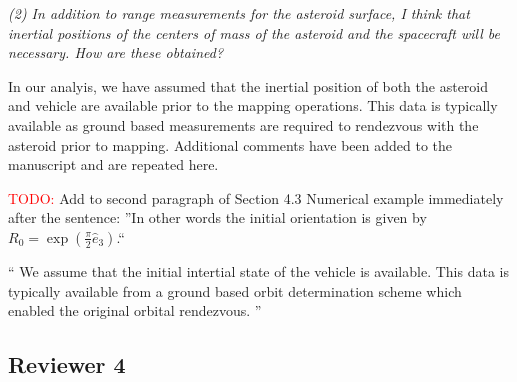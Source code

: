 \documentclass[11pt]{article}
\newcommand{\todo}{{\large \textcolor{red}{TODO: }}}
\newenvironment{correction}{\begin{list}{}{\setlength{\leftmargin}{1cm}\setlength{\rightmargin}{1cm}}\vspace{\parsep}\item[]``}{''\end{list}}
\newcommand{\comment}[1]{\item \itshape #1 \normalfont}
\begin{document}
\begin{itemize}
\comment{(2) In addition to range measurements for the asteroid surface, I think that inertial positions of the centers of mass of the asteroid and the spacecraft will be necessary.
How are these obtained?}

In our analyis, we have assumed that the inertial position of both the asteroid and vehicle are available prior to the mapping operations.
This data is typically available as ground based measurements are required to rendezvous with the asteroid prior to mapping.
Additional comments have been added to the manuscript and are repeated here.

\todo Add to second paragraph of Section 4.3 Numerical example immediately after the sentence: ''In other words the initial orientation is given by \( R_0 = \exp(\frac{\pi}{2} \hat e_3)\).``

\begin{correction}
    We assume that the initial intertial state of the vehicle is available. 
    This data is typically available from a ground based orbit determination scheme which enabled the original orbital rendezvous. 
\end{correction}

\end{itemize}


\clearpage\newpage
\subsection*{Reviewer 4}
\end{document}
